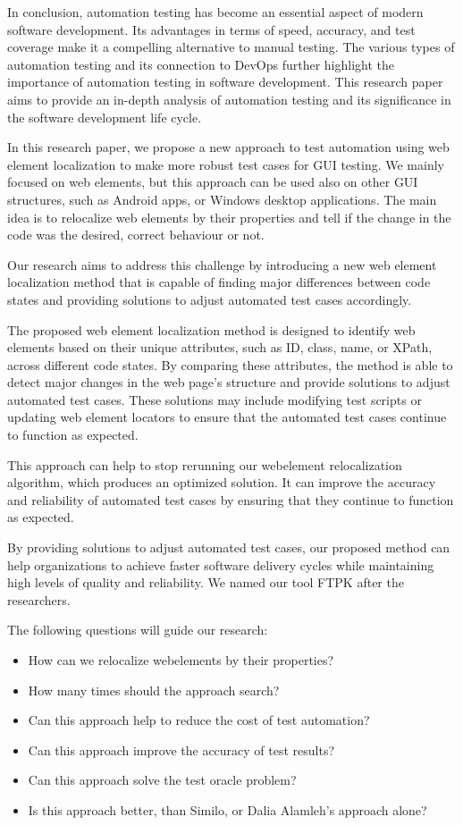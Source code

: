 \documentclass{article}
\begin{document}
In conclusion, automation testing has become an essential aspect of modern software development. Its advantages in terms of speed, accuracy, and test coverage make it a compelling alternative to manual testing. The various types of automation testing and its connection to DevOps further highlight the importance of automation testing in software development. This research paper aims to provide an in-depth analysis of automation testing and its significance in the software development life cycle.

In this research paper, we propose a new approach to test automation using web element localization to make more robust test cases for GUI testing. We mainly focused on web elements, but this approach can be used also on other GUI structures, such as Android apps, or Windows desktop applications. The main idea is to relocalize web elements by their properties and tell if the change in the code was the desired, correct behaviour or not. 

Our research aims to address this challenge by introducing a new web element localization method that is capable of finding major differences between code states and providing solutions to adjust automated test cases accordingly.

The proposed web element localization method is designed to identify web elements based on their unique attributes, such as ID, class, name, or XPath, across different code states. By comparing these attributes, the method is able to detect major changes in the web page's structure and provide solutions to adjust automated test cases. These solutions may include modifying test scripts or updating web element locators to ensure that the automated test cases continue to function as expected.

This approach can help to stop rerunning our webelement relocalization algorithm, which produces an optimized solution. It can improve the accuracy and reliability of automated test cases by ensuring that they continue to function as expected.

By providing solutions to adjust automated test cases, our proposed method can help organizations to achieve faster software delivery cycles while maintaining high levels of quality and reliability. We named our tool FTPK after the researchers.

The following questions will guide our research:

\begin{itemize}
\item How can we relocalize webelements by their properties?
\item How many times should the approach search?
\item Can this approach help to reduce the cost of test automation?
\item Can this approach improve the accuracy of test results?
\item Can this approach solve the test oracle problem?
\item Is this approach better, than Similo, or Dalia Alamleh's approach alone?
\end{itemize}
\end{document}
